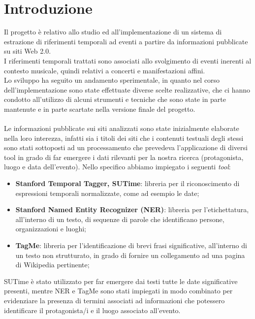\documentclass[a4paper]{report}
\begin{document}
\chapter{Introduzione}
Il progetto\cite{0} è relativo allo studio ed all'implementazione di un sistema di estrazione di riferimenti temporali ad eventi a partire da informazioni pubblicate su siti Web 2.0. \\
I riferimenti temporali trattati sono associati allo svolgimento di eventi inerenti al contesto musicale, quindi relativi a concerti e manifestazioni affini. \\
Lo sviluppo ha seguito un andamento sperimentale, in quanto nel corso dell'implementazione sono state effettuate diverse scelte realizzative, che ci hanno condotto all'utilizzo di alcuni strumenti e tecniche che sono state in parte mantenute e in parte scartate nella versione finale del progetto. \\ 
\\
Le informazioni pubblicate sui siti analizzati sono state inizialmente elaborate nella loro interezza, infatti sia i titoli dei siti che i contenuti testuali degli stessi sono stati sottoposti ad un processamento che prevedeva l'applicazione di diversi tool in grado di far emergere i dati rilevanti per la nostra ricerca (protagonista, luogo e data dell'evento). Nello specifico abbiamo impiegato i seguenti \textit{tool}:
\begin{itemize}
\item \textbf{Stanford Temporal Tagger, SUTime}\cite{1}: libreria per il riconoscimento di espressioni temporali normalizzate, come ad esempio le date;
\item \textbf{Stanford Named Entity Recognizer (NER)}\cite{2}:  libreria per l'etichettatura, all'interno di un testo, di sequenze di parole che identificano persone, organizzazioni e luoghi;
\item \textbf{TagMe}\cite{3}: libreria per l'identificazione di brevi frasi significative, all'interno di un testo non strutturato, in grado di fornire un collegamento ad una pagina di Wikipedia pertinente;
\end{itemize}
SUTime è stato utilizzato per far emergere dai testi tutte le date significative presenti, mentre NER e TagMe sono stati impiegati in modo combinato per evidenziare la presenza di termini associati ad informazioni che potessero identificare il protagonista/i e il luogo associato all'evento.
\end{document}
